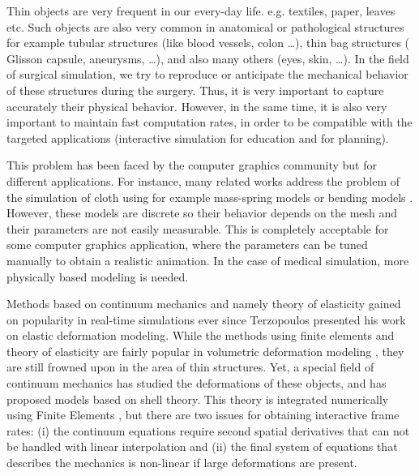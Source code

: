 \documentclass{egpubl}
\begin{document}
Thin objects are very frequent in our every-day life. %
e.g. textiles, paper, leaves etc. 
Such objects are also very common in anatomical or pathological structures for example tubular structures (like blood vessels, colon \ldots), thin bag structures (%
Glisson capsule, aneurysms,  \ldots), and also many others (eyes, skin, \ldots). 
In the field of surgical simulation, we try to reproduce or anticipate the mechanical behavior of these structures during the surgery.
Thus, it is very important to capture accurately their physical behavior.
However, in the same time, it is also very important to maintain fast computation rates, in order to be compatible with the targeted applications (interactive simulation for education and for planning).

This problem has been faced by the computer graphics community but for different applications.
For instance, many related works address the problem of the simulation of cloth using for example mass-spring models or bending models \cite{Volino2009,Grinspun2003}. %
However, these models are discrete so their behavior depends on the mesh and their parameters are not easily measurable.
This is completely acceptable for some computer graphics application, where the parameters can be tuned manually to obtain a realistic animation.
In the case of medical simulation, more physically based modeling is needed.


Methods based on continuum mechanics and namely theory of elasticity gained on popularity in real-time simulations ever since Terzopoulos \cite{Terzopoulos1987} presented his work on elastic deformation modeling.
While the methods using finite elements and theory of elasticity are fairly popular in volumetric deformation modeling \cite{Cotin1999,Nesme2006,Miller2007}, they are still frowned upon in the area of thin structures. 
Yet, a special field of continuum mechanics has studied the deformations of these objects, and has proposed models based on shell theory.
This theory is integrated numerically using Finite Elements \cite{Reddy1993}, but there are two issues for obtaining interactive frame rates: 
(i) the continuum equations require second spatial derivatives that can not be handled with linear interpolation and 
(ii) the final system of equations that describes the mechanics is non-linear if large deformations are present. 
\end{document}
